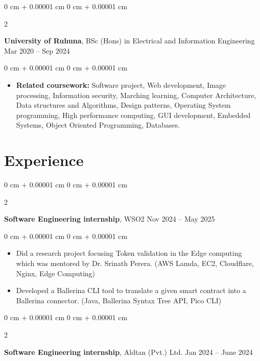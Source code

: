\documentclass[10pt, letterpaper]{article}
\newenvironment{highlights}{
    \begin{itemize}[
        topsep=0.10 cm,
        parsep=0.10 cm,
        partopsep=0pt,
        itemsep=0pt,
        leftmargin=0 cm + 10pt
    ]
}{
    \end{itemize}
} %
\newenvironment{onecolentry}{
    \begin{adjustwidth}{
        0 cm + 0.00001 cm
    }{
        0 cm + 0.00001 cm
    }
}{
    \end{adjustwidth}
} %
\newenvironment{twocolentry}[2][]{
    \onecolentry
    \def\secondColumn{#2}
    \setcolumnwidth{\fill, 4.5 cm}
    \begin{paracol}{2}
}{
    \switchcolumn \raggedleft \secondColumn
    \end{paracol}
    \endonecolentry
} %
\begin{document}
        \begin{twocolentry}{
            Mar 2020 – Sep 2024
        }
            \textbf{University of Ruhuna}, BSc (Hons) in Electrical and Information Engineering\end{twocolentry}

        \vspace{0.10 cm}
        \begin{onecolentry}
            \begin{highlights}
            \justifying
                \item \textbf {Related coursework:} Software project, Web development, Image processing, Information security,  Marching learning, Computer Architecture, Data structures and Algorithms, Design patterns, Operating System programming, High performance computing, GUI development, Embedded Systems, Object Oriented Programming, Databases.
            \end{highlights}
        \end{onecolentry}



    
    \section{Experience}

            \begin{twocolentry}{
            Nov 2024 – May 2025
        }
            \textbf{Software Engineering internship}, WSO2\end{twocolentry}

        \vspace{0.10 cm}
        \begin{onecolentry}
            \begin{highlights}
                \item Did a research project focusing Token validation in the Edge computing which was mentored by Dr. Srinath Perera. (AWS Lamda, EC2, Cloudflare, Nginx, Edge Computing)
                \item Developed a Ballerina CLI tool to translate a given smart contract into a Ballerina connector. (Java, Ballerina Syntax Tree API, Pico CLI)
            \end{highlights}
        \end{onecolentry}

        \vspace{0.2 cm}
        

        \begin{twocolentry}{
            Jan 2024 – June 2024
        }
            \textbf{Software Engineering internship}, Aldtan (Pvt.) Ltd.\end{twocolentry}
\end{document}

